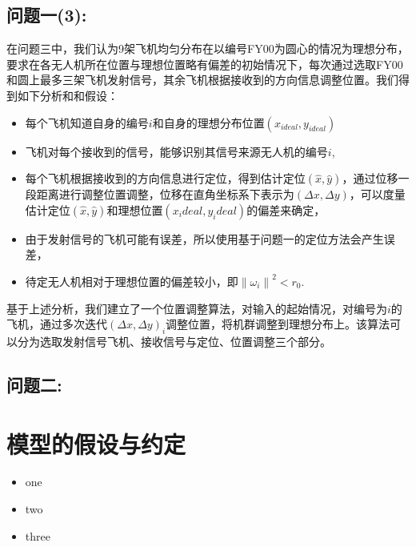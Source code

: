 \documentclass[withoutpreface,bwprint]{cumcmthesis} %
\begin{document}
		\subsection{问题一(3):}
		在问题三中，我们认为9架飞机均匀分布在以编号FY00为圆心的情况为理想分布，要求在各无人机所在位置与理想位置略有偏差的初始情况下，每次通过选取FY00和圆上最多三架飞机发射信号，其余飞机根据接收到的方向信息调整位置。我们得到如下分析和和假设：
		\begin{itemize}
			\item	每个飞机知道自身的编号$i$和自身的理想分布位置$(x_{ideal},y_{ideal})$
			\item   飞机对每个接收到的信号，能够识别其信号来源无人机的编号$i$,
			\item	每个飞机根据接收到的方向信息进行定位，得到估计定位$(\hat{x},\hat{y})$，通过位移一段距离进行调整位置调整，位移在直角坐标系下表示为$(\Delta{}x,\Delta{}y)$，可以度量估计定位$(\hat{x},\hat{y})$和理想位置$(x_ideal,y_ideal)$的偏差来确定，
			\item	由于发射信号的飞机可能有误差，所以使用基于问题一的定位方法会产生误差，
			\item 	待定无人机相对于理想位置的偏差较小，即$ {\lVert \omega_i \rVert}^2 < r_0 $.
		\end{itemize}
		基于上述分析，我们建立了一个位置调整算法，对输入的起始情况，对编号为$i$的飞机，通过多次迭代$(\Delta{}x,\Delta{}y)_i$调整位置，将机群调整到理想分布上。该算法可以分为选取发射信号飞机、接收信号与定位、位置调整三个部分。
		\subsection{问题二:}
	\section{模型的假设与约定}
		\begin{itemize}
			\item{} one
			\item{} two
			\item{} three
		\end{itemize}
\end{document}
